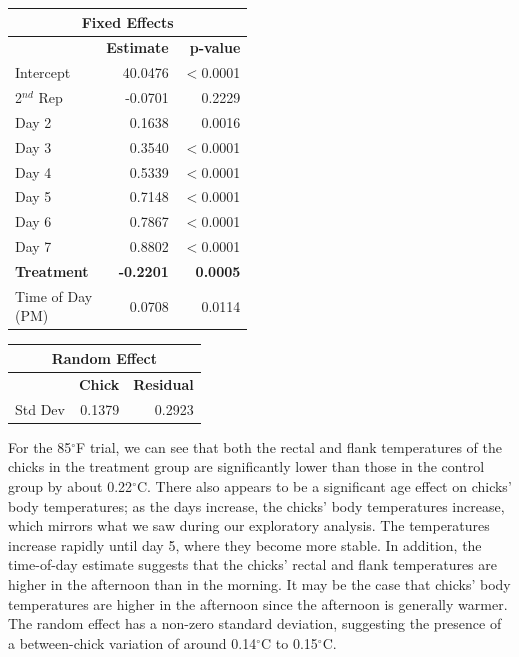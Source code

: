\documentclass[a4paper, 10pt, titlepage]{article}
\newcommand\Tstrut{\rule{0pt}{2.9ex}}         %
\newcommand\Bstrut{\rule[-1.2ex]{0pt}{0pt}}   %
\begin{document}
\begin{table}[ht]
\centering
{} 
\begin{tabular}[t]{lrr}
 \hline
 \multicolumn{3}{c}{\textbf{Fixed Effects}}\\
 \hline
 & \textbf{Estimate} & \textbf{p-value}\Tstrut\\ 
 Intercept & 40.0476 & $<$0.0001\\
 2$^{nd}$ Rep & -0.0701 & 0.2229\\
 Day 2 & 0.1638 & 0.0016\\
 Day 3 & 0.3540 & $<$0.0001\\
 Day 4 & 0.5339 & $<$0.0001\\
 Day 5 & 0.7148 & $<$0.0001\\
 Day 6 & 0.7867 & $<$0.0001\\
 Day 7 & 0.8802 & $<$0.0001\\
 \textbf{Treatment} & \textbf{-0.2201} & \textbf{0.0005}\\
 \makecell[l]{Time of Day \\ (PM)\Bstrut} & 0.0708 & 0.0114\\
 \hline
\end{tabular}
\quad
\begin{tabular}[t]{lrr}
 \hline
\multicolumn{3}{c}{\textbf{Random Effect}}\\
 \hline
 & \textbf{Chick} & \textbf{Residual}\Tstrut \\ 
 Std Dev & 0.1379 & 0.2923\Bstrut\\
 \hline
\end{tabular}
\label{table:Est 85 F}
\end{table}

For the 85$^{\circ}$F trial, we can see that both the rectal and flank temperatures of the chicks in the treatment group  are significantly lower than those in the control group by about 0.22$^{\circ}$C. There also appears to be a significant age effect on chicks’ body temperatures; as the days increase, the chicks' body temperatures increase, which mirrors what we saw during our exploratory analysis. The temperatures increase rapidly until day 5, where they become more stable. In addition, the time-of-day estimate suggests that the chicks’ rectal and flank temperatures are higher in the afternoon than in the morning. It may be the case that chicks’ body temperatures are higher in the afternoon since the afternoon is generally warmer. The random effect has a non-zero standard deviation, suggesting the presence of a between-chick variation of around 0.14$^{\circ}$C to 0.15$^{\circ}$C.
\end{document}
